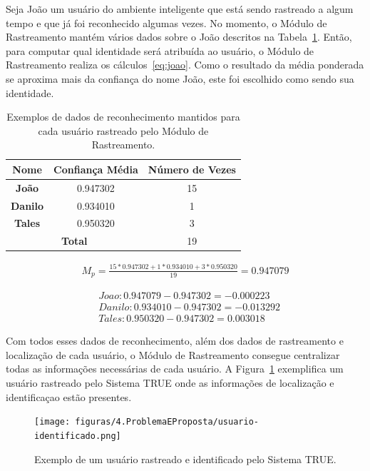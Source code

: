 	\begin{description}
		Seja João um usuário do ambiente inteligente que está sendo rastreado a algum tempo e que já foi reconhecido algumas vezes. No momento, o Módulo de Rastreamento mantém vários dados sobre o João descritos na Tabela~\ref{tab:joao}. Então, para computar qual identidade será atribuída ao usuário, o Módulo de Rastreamento realiza os cálculos~\ref{eq:joao}. Como o resultado da média ponderada se aproxima mais da confiança do nome João, este foi escolhido como sendo sua identidade.
	\end{description}

	\begin{table}[hbt]
		\begin{center}
			\caption{Exemplos de dados de reconhecimento mantidos para cada usuário rastreado pelo Módulo de Rastreamento.}
			\begin{tabular}{|c|c|c|}
				\hline \bf Nome & Confiança Média & Número de Vezes \\
				\hline \hline \bf João & 0.947302 & 15 \\
				\hline \bf  Danilo & 0.934010 & 1 \\
				\hline \bf Tales & 0.950320 & 3 \\
				\hline
				\hline \multicolumn{2}{|c|}{\bf Total}  & 19 \\
				\hline
			\end{tabular}
		\end{center}
		\label{tab:joao}
	\end{table}

	\begin{align}
		\label{eq:joao}
		M_p = \frac{15 * 0.947302 + 1 * 0.934010 + 3 * 0.950320}{19} = 0.947079
	\end{align}

	\begin{align}
	\nonumber & Joao: 0.947079 - 0.947302 = -0.000223\\
		\nonumber & Danilo: 0.934010 - 0.947302 = -0.013292\\
		\nonumber & Tales: 0.950320 - 0.947302 = 0.003018
	\end{align}

	Com todos esses dados de reconhecimento, além dos dados de rastreamento e localização de cada usuário, o Módulo de Rastreamento consegue centralizar todas as informações necessárias de cada usuário. A Figura~\ref{fig:truetotal} exemplifica um usuário rastreado pelo Sistema TRUE onde as informações de localização e identificaçao estão presentes.

	\begin{figure}[hbt]
			\begin{center}
				\texttt{[image: figuras/4.ProblemaEProposta/usuario-identificado.png]}
			\end{center}
			\caption{Exemplo de um usuário rastreado e identificado pelo Sistema TRUE.}
			\label{fig:truetotal}
		\end{figure}

